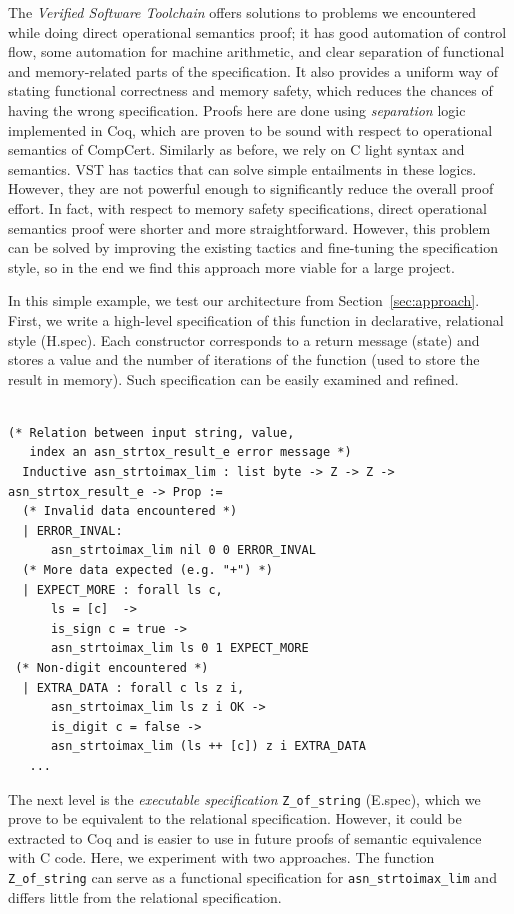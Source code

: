 \documentclass[10p,conference]{IEEEtran}
\begin{document}
The \textit{Verified Software Toolchain} offers solutions
to problems we encountered while doing direct operational semantics
proof; it has good automation of control flow, some automation for
machine arithmetic, and clear separation of functional and
memory-related parts of the specification. It also provides a uniform
way of stating functional correctness and memory safety, which reduces
the chances of having the wrong specification. Proofs here are done
using \textit{separation} logic implemented in Coq,
which are proven to be sound with respect to operational semantics of
CompCert. Similarly as before, we rely on C light syntax and
semantics. VST has tactics that can solve simple entailments in these
logics. However, they are not powerful enough to significantly reduce
the overall proof effort. In fact, with respect to memory safety
specifications, direct operational semantics proof were shorter and
more straightforward. However, this problem can be solved by improving
the existing tactics and fine-tuning the specification style, so in
the end we find this approach more viable for a large project.

In this simple example, we test our architecture from
Section~\ref{sec:approach}. First, we write a high-level specification
of this function in declarative, relational style (H.spec). Each constructor
corresponds to a return message (state) and stores a value and the
number of iterations of the function (used to store the result in
memory). Such specification can be easily examined and refined.

 \begin{lstlisting}[language=Coq]

(* Relation between input string, value, 
   index an asn_strtox_result_e error message *)
  Inductive asn_strtoimax_lim : list byte -> Z -> Z -> asn_strtox_result_e -> Prop :=
  (* Invalid data encountered *)
  | ERROR_INVAL:
      asn_strtoimax_lim nil 0 0 ERROR_INVAL
  (* More data expected (e.g. "+") *)
  | EXPECT_MORE : forall ls c,
      ls = [c]  ->
      is_sign c = true ->
      asn_strtoimax_lim ls 0 1 EXPECT_MORE
 (* Non-digit encountered *)
  | EXTRA_DATA : forall c ls z i,
      asn_strtoimax_lim ls z i OK ->
      is_digit c = false -> 
      asn_strtoimax_lim (ls ++ [c]) z i EXTRA_DATA
   ...    
  \end{lstlisting}

  The next level is the \textit{executable specification}
  \texttt{Z\_of\_string} (E.spec), which we prove to be equivalent to the
  relational specification. However, it could be extracted to Coq and
  is easier to use in future proofs of semantic equivalence with C
  code. Here, we experiment with two approaches. The function 
   \texttt{Z\_of\_string} can serve as a functional specification for
  \texttt{asn\_strtoimax\_lim} and differs little from the
  relational specification. 
\end{document}
